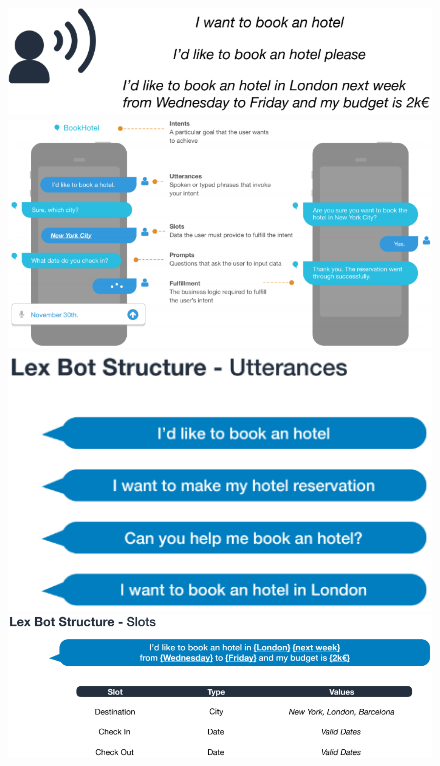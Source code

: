 \documentclass[a4paper,11pt,oneside]{book}
\begin{document}
\begin{figure}[!h]
	\centering
	\includegraphics[scale=0.55]{immagini/Lex_general3.png}
	\includegraphics[scale=0.65]{immagini/Lex_general.png}
	\includegraphics[scale=0.6]{immagini/Lex_general1.png}
	\includegraphics[scale=0.5]{immagini/Lex_general2.png}
\end{figure}
\end{document}
